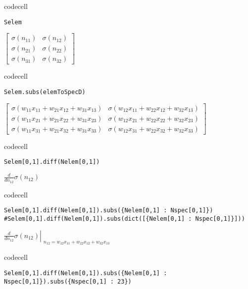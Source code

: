 codecell

\begin{verbatim}
Selem
\end{verbatim}

$\displaystyle \left[\begin{matrix}\sigma{\left(n_{11} \right)} & \sigma{\left(n_{12} \right)}\\\sigma{\left(n_{21} \right)} & \sigma{\left(n_{22} \right)}\\\sigma{\left(n_{31} \right)} & \sigma{\left(n_{32} \right)}\end{matrix}\right]$

codecell

\begin{verbatim}
Selem.subs(elemToSpecD)
\end{verbatim}

$\displaystyle \left[\begin{matrix}\sigma{\left(w_{11} x_{11} + w_{21} x_{12} + w_{31} x_{13} \right)} & \sigma{\left(w_{12} x_{11} + w_{22} x_{12} + w_{32} x_{13} \right)}\\\sigma{\left(w_{11} x_{21} + w_{21} x_{22} + w_{31} x_{23} \right)} & \sigma{\left(w_{12} x_{21} + w_{22} x_{22} + w_{32} x_{23} \right)}\\\sigma{\left(w_{11} x_{31} + w_{21} x_{32} + w_{31} x_{33} \right)} & \sigma{\left(w_{12} x_{31} + w_{22} x_{32} + w_{32} x_{33} \right)}\end{matrix}\right]$

codecell

\begin{verbatim}
Selem[0,1].diff(Nelem[0,1])
\end{verbatim}

$\displaystyle \frac{d}{d n_{12}} \sigma{\left(n_{12} \right)}$

codecell

\begin{verbatim}
Selem[0,1].diff(Nelem[0,1]).subs({Nelem[0,1] : Nspec[0,1]})
#Selem[0,1].diff(Nelem[0,1]).subs(dict([{Nelem[0,1] : Nspec[0,1]}]))
\end{verbatim}

$\displaystyle \left. \frac{d}{d n_{12}} \sigma{\left(n_{12} \right)} \right|_{\substack{ n_{12}=w_{12} x_{11} + w_{22} x_{12} + w_{32} x_{13} }}$

codecell

\begin{verbatim}
Selem[0,1].diff(Nelem[0,1]).subs({Nelem[0,1] : Nspec[0,1]}).subs({Nspec[0,1] : 23})
\end{verbatim}

